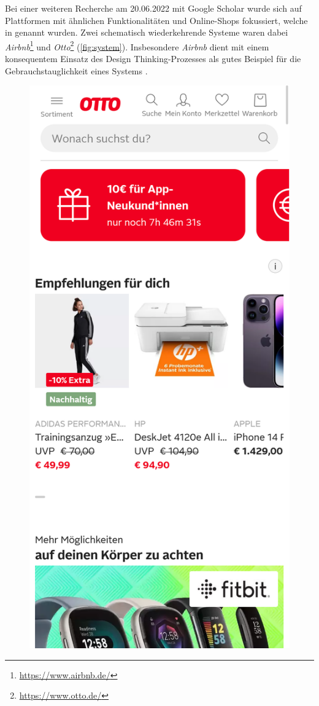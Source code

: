Bei einer weiteren Recherche am 20.06.2022 mit Google Scholar wurde sich auf
Plattformen mit ähnlichen Funktionalitäten und Online-Shops fokussiert, welche
in  genannt wurden. Zwei schematisch
wiederkehrende Systeme waren dabei
\textit{Airbnb}\footnote{\url{https://www.airbnb.de/}} und
\textit{Otto}\footnote{\url{https://www.otto.de/}} (\ref{fig:system}).
Insbesondere \textit{Airbnb} dient mit einem konsequentem Einsatz des Design
Thinking-Prozesses als gutes Beispiel für die Gebrauchstauglichkeit eines
Systems \cite{glitza_hands_2019}.

\begin{figure}[h]
        \centering
        \includegraphics[scale=0.1]{Bilder/otto.png}\hspace{1em}

\end{figure}
